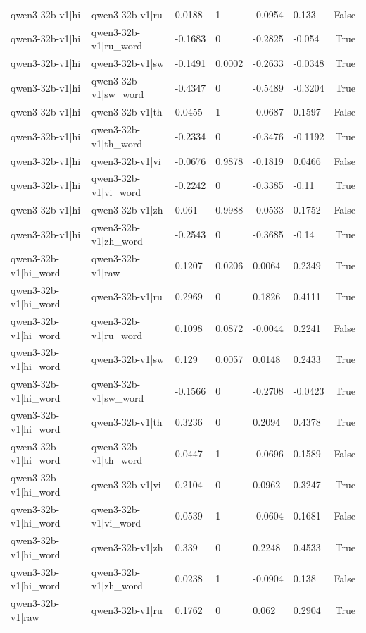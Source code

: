 \begin{table}
\begin{tabular}{llllllr}
qwen3-32b-v1|hi & qwen3-32b-v1|ru & 0.0188 & 1 & -0.0954 & 0.133 & False \\
qwen3-32b-v1|hi & qwen3-32b-v1|ru_word & -0.1683 & 0 & -0.2825 & -0.054 & True \\
qwen3-32b-v1|hi & qwen3-32b-v1|sw & -0.1491 & 0.0002 & -0.2633 & -0.0348 & True \\
qwen3-32b-v1|hi & qwen3-32b-v1|sw_word & -0.4347 & 0 & -0.5489 & -0.3204 & True \\
qwen3-32b-v1|hi & qwen3-32b-v1|th & 0.0455 & 1 & -0.0687 & 0.1597 & False \\
qwen3-32b-v1|hi & qwen3-32b-v1|th_word & -0.2334 & 0 & -0.3476 & -0.1192 & True \\
qwen3-32b-v1|hi & qwen3-32b-v1|vi & -0.0676 & 0.9878 & -0.1819 & 0.0466 & False \\
qwen3-32b-v1|hi & qwen3-32b-v1|vi_word & -0.2242 & 0 & -0.3385 & -0.11 & True \\
qwen3-32b-v1|hi & qwen3-32b-v1|zh & 0.061 & 0.9988 & -0.0533 & 0.1752 & False \\
qwen3-32b-v1|hi & qwen3-32b-v1|zh_word & -0.2543 & 0 & -0.3685 & -0.14 & True \\
qwen3-32b-v1|hi_word & qwen3-32b-v1|raw & 0.1207 & 0.0206 & 0.0064 & 0.2349 & True \\
qwen3-32b-v1|hi_word & qwen3-32b-v1|ru & 0.2969 & 0 & 0.1826 & 0.4111 & True \\
qwen3-32b-v1|hi_word & qwen3-32b-v1|ru_word & 0.1098 & 0.0872 & -0.0044 & 0.2241 & False \\
qwen3-32b-v1|hi_word & qwen3-32b-v1|sw & 0.129 & 0.0057 & 0.0148 & 0.2433 & True \\
qwen3-32b-v1|hi_word & qwen3-32b-v1|sw_word & -0.1566 & 0 & -0.2708 & -0.0423 & True \\
qwen3-32b-v1|hi_word & qwen3-32b-v1|th & 0.3236 & 0 & 0.2094 & 0.4378 & True \\
qwen3-32b-v1|hi_word & qwen3-32b-v1|th_word & 0.0447 & 1 & -0.0696 & 0.1589 & False \\
qwen3-32b-v1|hi_word & qwen3-32b-v1|vi & 0.2104 & 0 & 0.0962 & 0.3247 & True \\
qwen3-32b-v1|hi_word & qwen3-32b-v1|vi_word & 0.0539 & 1 & -0.0604 & 0.1681 & False \\
qwen3-32b-v1|hi_word & qwen3-32b-v1|zh & 0.339 & 0 & 0.2248 & 0.4533 & True \\
qwen3-32b-v1|hi_word & qwen3-32b-v1|zh_word & 0.0238 & 1 & -0.0904 & 0.138 & False \\
qwen3-32b-v1|raw & qwen3-32b-v1|ru & 0.1762 & 0 & 0.062 & 0.2904 & True \\

\end{tabular}
\end{table}
